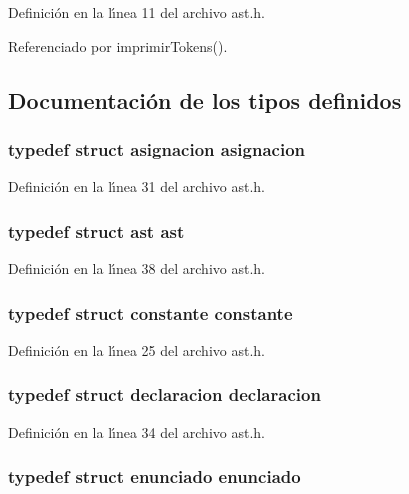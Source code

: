 Definici\'{o}n en la l\'{\i}nea 11 del archivo ast.h.

Referenciado por imprimir\-Tokens().

\subsection{Documentaci\'{o}n de los tipos definidos}
\subsubsection{\setlength{\rightskip}{0pt plus 5cm}typedef struct {\bf asignacion} {\bf asignacion}}\label{ast_8h_a9}




Definici\'{o}n en la l\'{\i}nea 31 del archivo ast.h.
\subsubsection{\setlength{\rightskip}{0pt plus 5cm}typedef struct {\bf ast} {\bf ast}}\label{ast_8h_a16}




Definici\'{o}n en la l\'{\i}nea 38 del archivo ast.h.
\subsubsection{\setlength{\rightskip}{0pt plus 5cm}typedef struct {\bf constante} {\bf constante}}\label{ast_8h_a3}




Definici\'{o}n en la l\'{\i}nea 25 del archivo ast.h.
\subsubsection{\setlength{\rightskip}{0pt plus 5cm}typedef struct {\bf declaracion} {\bf declaracion}}\label{ast_8h_a12}




Definici\'{o}n en la l\'{\i}nea 34 del archivo ast.h.
\subsubsection{\setlength{\rightskip}{0pt plus 5cm}typedef struct {\bf enunciado} {\bf enunciado}}\label{ast_8h_a13}





